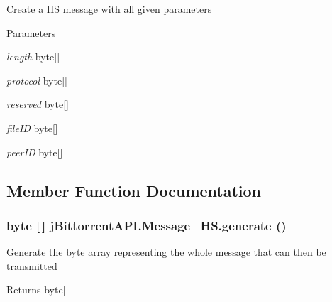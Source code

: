 \label{classj_bittorrent_a_p_i_1_1_message___h_s_a720a309bdaf8566f98a351f7e8d98c05}
Create a HS message with all given parameters 
\begin{DoxyParams}{Parameters}
\item[{\em length}]byte\mbox{[}\mbox{]} \item[{\em protocol}]byte\mbox{[}\mbox{]} \item[{\em reserved}]byte\mbox{[}\mbox{]} \item[{\em fileID}]byte\mbox{[}\mbox{]} \item[{\em peerID}]byte\mbox{[}\mbox{]} \end{DoxyParams}


\subsection{Member Function Documentation}
\hypertarget{classj_bittorrent_a_p_i_1_1_message___h_s_a65f7878db0225ce3f390a63aa2548673}{
\subsubsection[{generate}]{\setlength{\rightskip}{0pt plus 5cm}byte \mbox{[}$\,$\mbox{]} jBittorrentAPI.Message\_\-HS.generate ()}}
\label{classj_bittorrent_a_p_i_1_1_message___h_s_a65f7878db0225ce3f390a63aa2548673}
Generate the byte array representing the whole message that can then be transmitted \begin{DoxyReturn}{Returns}
byte\mbox{[}\mbox{]} 
\end{DoxyReturn}


